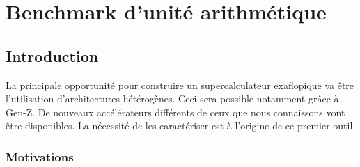 \section{Benchmark d'unité arithmétique}\label{sec:kg}



\subsection{Introduction}
   
     
    La principale opportunité pour construire un supercalculateur exaflopique va être l'utilisation d'architectures hétérogènes. Ceci sera possible notamment grâce à Gen-Z. De nouveaux accélérateurs différents de ceux que nous connaissons vont être disponibles. La nécessité de les caractériser est à l'origine de ce premier outil.

    \subsubsection{Motivations}
    
